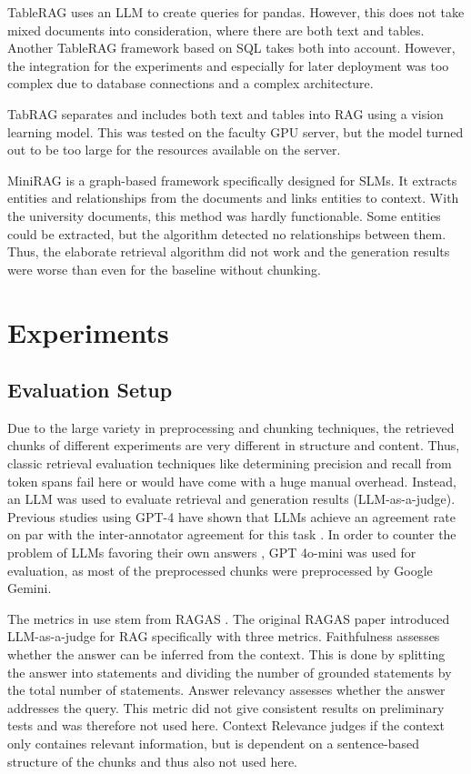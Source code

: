 \documentclass[12pt]{article} %
\begin{document}
TableRAG \parencite{chen2024tablerag} uses an LLM to create queries for pandas. However, this does not take mixed documents into consideration, where there are both text and tables. Another TableRAG framework based on SQL \parencite{yu2025tablerag} takes both into account. However, the integration for the experiments and especially for later deployment was too complex due to database connections and a complex architecture.

TabRAG \parencite{si2025tabrag} separates and includes both text and tables into RAG using a vision learning model. This was tested on the faculty GPU server, but the model turned out to be too large for the resources available on the server.

MiniRAG \parencite{fan2025minirag} is a graph-based framework specifically designed for SLMs. It extracts entities and relationships from the documents and links entities to context. With the university documents, this method was hardly functionable. Some entities could be extracted, but the algorithm detected no relationships between them. Thus, the elaborate retrieval algorithm did not work and the generation results were worse than even for the baseline without chunking.


\section{Experiments}
\subsection{Evaluation Setup}
Due to the large variety in preprocessing and chunking techniques, the retrieved chunks of different experiments are very different in structure and content. Thus, classic retrieval evaluation techniques like determining precision and recall from token spans fail here or would have come with a huge manual overhead. Instead, an LLM was used to evaluate retrieval and generation results (LLM-as-a-judge). Previous studies using GPT-4 have shown that LLMs achieve an agreement rate on par with the inter-annotator agreement for this task \parencite{liu2023g,zheng2023judging}. In order to counter the problem of LLMs favoring their own answers \parencite{chen2025llm}, GPT 4o-mini was used for evaluation, as most of the preprocessed chunks were preprocessed by Google Gemini.

The metrics in use stem from RAGAS \parencite{es2024ragas}. The original RAGAS paper introduced LLM-as-a-judge for RAG specifically with three metrics. Faithfulness assesses whether the answer can be inferred from the context. This is done by splitting the answer into statements and dividing the number of grounded statements by the total number of statements. Answer relevancy assesses whether the answer addresses the query. This metric did not give consistent results on preliminary tests and was therefore not used here. Context Relevance judges if the context only containes relevant information, but is dependent on a sentence-based structure of the chunks and thus also not used here.
\end{document}
